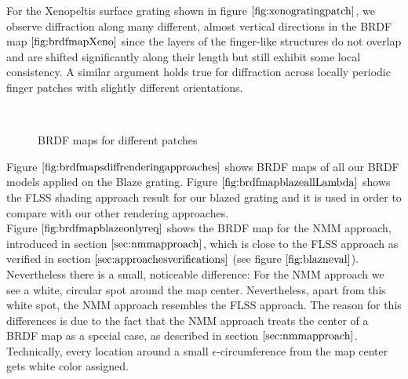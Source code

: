 For the Xenopeltis surface grating shown in figure $\ref{fig:xenogratingpatch}$, we observe diffraction along many different, almost vertical directions in the BRDF map $\ref{fig:brdfmapXeno}$ since the layers of the finger-like structures do not overlap and are shifted significantly along their length but still exhibit some local consistency. A similar argument holds true for diffraction across locally periodic finger patches with slightly different orientations. 

\begin{figure}[H]
  \centering
~
~

\caption[BRDF Map: FLSS Approach applied on various Gratings]{BRDF maps for different patches}
\label{fig:brdfmapsdiffpatches}
\end{figure}


Figure $\ref{fig:brdfmapsdiffrenderingapproaches}$ shows BRDF maps of all our BRDF models applied on the Blaze grating. Figure $\ref{fig:brdfmapblazeallLambda}$ shows the FLSS shading approach result for our blazed grating and it is used in order to compare with our other rendering approaches. \\

Figure $\ref{fig:brdfmapblazeonlyreq}$ shows the BRDF map for the NMM approach, introduced in section $\ref{sec:nmmapproach}$, which is close to the FLSS approach as verified in section $\ref{sec:approachesverifications}$ (see figure $\ref{fig:blazneval}$). Nevertheless there is a small, noticeable difference: For the NMM approach we see a white, circular spot around the map center. Nevertheless, apart from this white spot, the NMM approach resembles the FLSS approach. The reason for this differences is due to the fact that the NMM approach treats the center of a BRDF map as a special case, as described in section $\ref{sec:nmmapproach}$. Technically, every location around a small $\epsilon$-circumference from the map center gets white color assigned. \\

